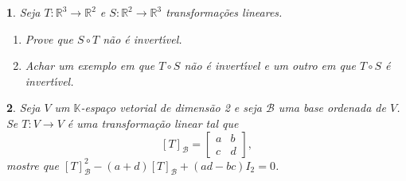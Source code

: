 \documentclass[12pt]{exam}
\newtheorem{exercicio}{}
\newcommand{\real}{\mathbb{R}}
\newcommand{\cp}[1]{\mathbb{#1}}
\begin{document}
\begin{exercicio}
  Seja $T : \real^3 \to \real^2$ e $S : \real^2 \to \real^3$ transforma\c{c}\~oes lineares.
  \begin{enumerate}[label=({\alph*})]
    \item Prove que $S \circ T$ n\~ao \'e invert{\'\i}vel.
    \item Achar um exemplo em que $T\circ S$ n\~ao \'e invert{\'\i}vel e um outro em que $T\circ S$ \'e invert{\'\i}vel.
  \end{enumerate}
\end{exercicio}

\begin{exercicio}
  Seja $V$ um $\cp{K}$-espa\c{c}o vetorial de dimens\~ao 2 e seja $\mathcal{B}$ uma base ordenada de $V$. Se $T: V \to V$ \'e uma transforma\c{c}\~ao linear tal que
  \[
    [T]_\mathcal{B} = \begin{bmatrix}
      a & b\\
      c & d
    \end{bmatrix},
  \]
  mostre que $[T]_\mathcal{B}^2 - (a + d)[T]_\mathcal{B} + (ad - bc)I_2 = 0$.
\end{exercicio}
\end{document}
